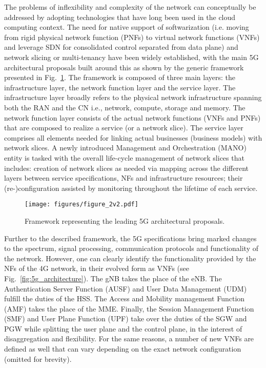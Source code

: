 \documentclass[journal,comsoc]{IEEEtran}
\begin{document}
% 
The problems of inflexibility and complexity of the network can conceptually be addressed by adopting technologies that have long been used in the cloud computing context.
The need for native support of softwarization (i.e. moving from rigid physical network function (PNFs) to virtual network functions (VNFs) and leverage SDN for consolidated control separated from data plane) and network slicing or multi-tenancy have been widely established, with the main 5G architectural proposals built around this as shown by the generic framework presented in Fig.~\ref{fig:architecture}.
The framework is composed of three main layers: the infrastructure layer, the network function layer and the service layer. 
The infrastructure layer broadly refers to the physical network infrastructure spanning both the RAN and the CN  i.e., network, compute, storage and memory. The network function layer consists of the actual network functions (VNFs and PNFs) that are composed to realize a service (or a network slice). The service layer comprises all elements needed for linking actual businesses (business models) with network slices. A newly introduced Management and Orchestration (MANO) entity is tasked with the overall life-cycle management of network slices that includes: creation of network slices as needed via mapping across the different layers between service specifications, NFs and infrastructure resources; their (re-)configuration assisted by monitoring throughout the lifetime of each service.

% 
\begin{figure}[t]
	\centering	
	\texttt{[image: figures/figure\_2v2.pdf]}
	\vspace{-10mm}
	\caption{Framework representing the leading 5G architectural proposals.}
    \label{fig:architecture}
    \vspace{-4mm}
\end{figure}

Further to the described framework, the 5G specifications bring marked changes to the spectrum, signal processing, communication protocols and functionality of the network. However, one can clearly identify the functionality provided by the NFs of the 4G network, in their evolved form as VNFs (see Fig.~\ref{fig:5g_architecture}). The gNB takes the place of the eNB. The Authentication Server Function (AUSF) and User Data Management (UDM) fulfill the duties of the HSS. The Access and Mobility management Function (AMF) takes the place of the MME. Finally, the Session Management Function (SMF) and User Plane Function (UPF) take over the duties of the SGW and PGW while splitting the user plane and the control plane, in the interest of disaggregation and flexibility. For the same reasons, a number of new VNFs are defined as well that can vary depending on the exact network configuration (omitted for brevity).
\end{document}
